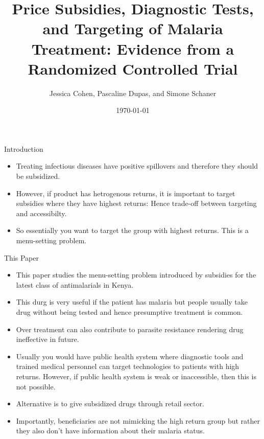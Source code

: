 \documentclass{beamer}
\begin{document}
\title{Price Subsidies, Diagnostic Tests, and Targeting of Malaria Treatment: Evidence from a Randomized Controlled Trial}
\author{Jessica Cohen, Pascaline Dupas, and Simone Schaner}
\date{\today}

\frame{\titlepage}

\begin{frame}{Introduction}
    \begin{itemize}
        \item Treating infectious diseases have positive spillovers and therefore they should be subsidized. 
        \item However, if product has hetrogenous returns, it is important to target subsidies where they have highest returns: Hence trade-off between targeting and accessibilty. 
        \item So essentially you want to target the group with highest returns. This is a menu-setting problem. 
    \end{itemize}
\end{frame}

\begin{frame}{This Paper}
\begin{itemize}
    \item This paper studies the menu-setting problem introduced by subsidies for the latest class of antimalarials in Kenya.
    \item This durg is very useful if the patient has malaria but people usually take drug without being tested and hence presumptive treatment is common.
    \item Over treatment can also contribute to parasite resistance rendering drug ineffective in future.
    \item Usually you would have public health system where diagnostic tools and trained medical personnel can target technologies to patients with high returns. However, if public health system is weak or inaccessible, then this is not possible.
    \item Alternative is to give subsidized drugs through retail sector. 
    \item Importantly, beneficiaries are not mimicking the high return group but rather they also don't have information about their malaria status.
\end{itemize}
\end{frame}
\end{document}
